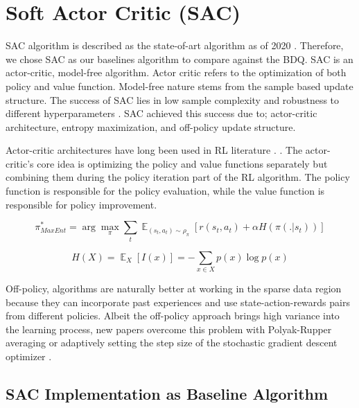 \section{Soft Actor Critic (SAC)}


SAC algorithm is described as the state-of-art algorithm as of 2020 \cite{stable-baselines}. Therefore, we chose SAC as our baselines algorithm to compare against the BDQ. SAC is an actor-critic, model-free algorithm. Actor critic refers to the optimization of both policy and value function. Model-free nature stems from the sample based update structure. The success of SAC lies in low sample complexity and robustness to different hyperparameters \cite{Haarnoja2018}. SAC achieved this success due to; actor-critic architecture, entropy maximization, and off-policy update structure.


Actor-critic architectures have long been used in RL literature \cite{Konda2000}. \cite{Haarnoja2018}. The actor-critic's core idea is optimizing the policy and value functions separately but combining them during the policy iteration part of the RL algorithm. The policy function is responsible for the policy evaluation, while the value function is responsible for policy improvement.


\begin{equation}
    \pi^*_{MaxEnt} = \arg\max_{\pi}\sum_t\mathop{\mathbb{E}}_{(s_t,a_t)\sim \rho_{\pi}}[r(s_t, a_t) + \alpha H(\pi(.|s_t))]
    \label{eq:maxentRL}
\end{equation}

\begin{equation}
    H(X) = \mathop{\mathbb{E}}_X [I(x)] = -\sum\limits_{x \in X} p(x)\log p(x)
\end{equation}

Off-policy, algorithms are naturally better at working in the sparse data region because they can incorporate past experiences and use state-action-rewards pairs from different policies.  Albeit the off-policy approach brings high variance into the learning process, new papers overcome this problem with Polyak-Rupper averaging or adaptively setting the step size of the stochastic gradient descent optimizer \cite{Sutton2018}.

\subsection{SAC Implementation as Baseline Algorithm}

